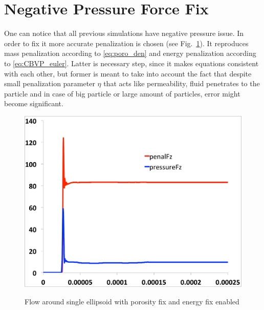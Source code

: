 \section{Negative Pressure Force Fix} \label{sec:fix}
One can notice that all previous simulations have negative pressure issue. In order to fix it more accurate penalization is chosen (see Fig.~\ref{fig:lofi_single_fix}). It reproduces mass penalization according to \eqref{eq:poro_den} and energy penalization according to \eqref{eq:CBVP_euler}. Latter is necessary step, since it makes equations consistent with each other, but former is meant to take into account the fact that despite small penalization parameter $\eta$ that acts like permeability, fluid penetrates to the particle and in case of big particle or large amount of particles, error might become significant.
\begin{figure}[t!]
\centering \includegraphics[scale=0.2]{fig/lofi_single_fix.pdf}\\
\caption{Flow around single ellipsoid with porosity fix and energy fix  enabled \label{fig:lofi_single_fix}}
\end{figure}